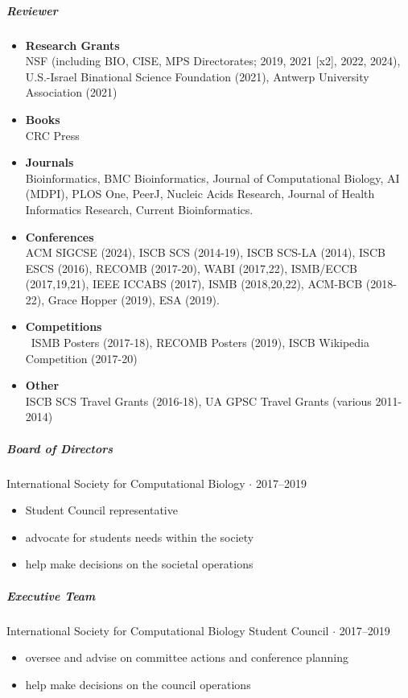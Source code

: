 \documentclass[10pt,letterpaper]{article}
\newcommand{\bigdot}{$\cdot$\xspace}
\begin{document}
\subparagraph{Reviewer} 
\begin{itemize}[leftmargin=!,labelindent=5pt,itemindent=-15pt]
    \item \textbf{Research Grants} \\ 
    	NSF (including BIO, CISE, MPS Directorates; 2019, 2021 [x2], 2022, 2024), 
	U.S.-Israel Binational Science Foundation (2021), 
	Antwerp University Association (2021)
    \item \textbf{Books} \\
    	CRC Press
    \item \textbf{Journals} \\
        Bioinformatics,
        BMC Bioinformatics, 
        Journal of Computational Biology,
        AI (MDPI), 
        PLOS One, 
        PeerJ, 
        Nucleic Acids Research, 
        Journal of Health Informatics Research,
        Current Bioinformatics.
    \item \textbf{Conferences} \\
    	ACM SIGCSE (2024),
        ISCB SCS (2014-19), %
        ISCB SCS-LA (2014), %
        ISCB ESCS (2016), %
	RECOMB (2017-20), %
	WABI (2017,22), %
	ISMB/ECCB (2017,19,21), %
    	IEEE ICCABS (2017), %
	ISMB (2018,20,22), %
	ACM-BCB (2018-22), %
	Grace Hopper (2019), %
	ESA (2019). %
     \item \textbf{Competitions} \\\
     	ISMB Posters (2017-18),
	RECOMB Posters (2019), 
     	ISCB Wikipedia Competition (2017-20)
     \item \textbf{Other} \\
         ISCB SCS Travel Grants (2016-18), 
         UA GPSC Travel Grants (various 2011-2014)
\end{itemize}

\subparagraph{Board of Directors}
International Society for Computational Biology  \bigdot 2017--2019
\begin{itemize}
    \item Student Council representative 
    \item advocate for students needs within the society
    \item help make decisions on the societal operations
\end{itemize}

\subparagraph{Executive Team}
International Society for Computational Biology Student Council \bigdot 2017--2019
\begin{itemize} 
    \item oversee and advise on committee actions and conference planning 
    \item help make decisions on the council operations
\end{itemize}
\end{document}
